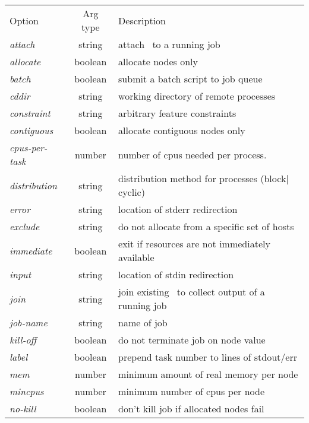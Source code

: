 \begin{table}[!tb]
\begin{center}
  \begin{tabular}[t]{lcl}
   \hhline{---}
      Option & Arg type & Description \\
   \hhline{---}
      {\em attach}	   & string & attach \srun\ to a running job	      \\
      {\em allocate}	   & boolean& allocate nodes only		      \\
      {\em batch}	   & boolean& submit a batch script to job queue      \\
      {\em cddir}	   & string & working directory of remote processes   \\
      {\em constraint}     & string & arbitrary feature constraints	      \\
      {\em contiguous}	   & boolean& allocate contiguous nodes only	      \\
      {\em cpus-per-task } & number & number of cpus needed per process.      \\
      {\em distribution}   & string & distribution method for processes (block$|$cyclic) \\
      {\em error}	   & string & location of stderr redirection	      \\
      {\em exclude}	   & string & do not allocate from a specific set of hosts \\
      {\em immediate}	   & boolean& exit if resources are not immediately available  \\
      {\em input}	   & string & location of stdin redirection	      \\
      {\em join}	   & string & join existing \srun\ to collect output of a running job \\
      {\em job-name}	   & string & name of job 			      \\
      {\em kill-off}	   & boolean& do not terminate job on node value      \\
      {\em label}	   & boolean& prepend task number to lines of stdout/err \\
      {\em mem}		   & number & minimum amount of real memory per node  \\
      {\em mincpus} 	   & number & minimum number of cpus per node         \\
      {\em no-kill}	   & boolean& don't kill job if allocated nodes fail  \\

\end{tabular}
\end{center}
\end{table}
